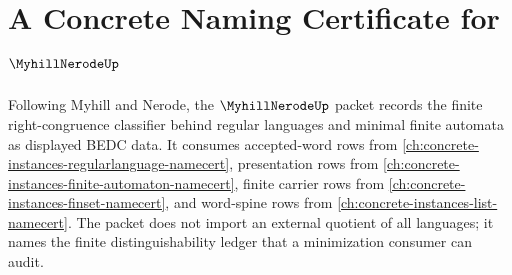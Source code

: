 \chapter{A Concrete Naming Certificate for $\MyhillNerodeUp$}
\label{ch:concrete-instances-myhill-nerode-namecert}

Following Myhill and Nerode, the $\MyhillNerodeUp$ packet records the finite right-congruence classifier behind regular languages and minimal finite automata as displayed BEDC data. It consumes accepted-word rows from \autoref{ch:concrete-instances-regularlanguage-namecert}, presentation rows from \autoref{ch:concrete-instances-finite-automaton-namecert}, finite carrier rows from \autoref{ch:concrete-instances-finset-namecert}, and word-spine rows from \autoref{ch:concrete-instances-list-namecert}. The packet does not import an external quotient of all languages; it names the finite distinguishability ledger that a minimization consumer can audit.

